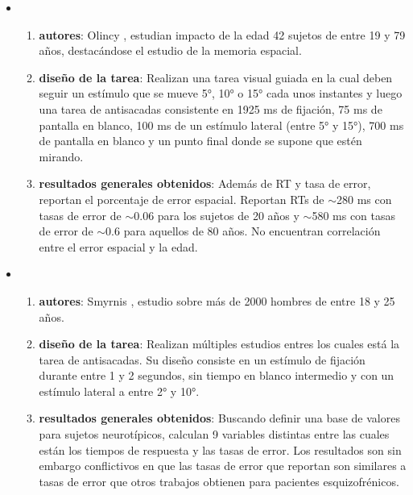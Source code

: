 \begin{itemize}
  \item \begin{enumerate}
    \item \textbf{autores}:
      Olincy \etal \cite{olincy_1997_age_diminishes_performance}, estudian
      impacto de la edad 42 sujetos de entre 19 y 79 años, destacándose el
      estudio de la memoria espacial.
    \item \textbf{diseño de la tarea}:
      Realizan una tarea visual guiada en la cual deben seguir un estímulo que
      se mueve 5°, 10° o 15° cada unos instantes y luego una tarea de
      antisacadas consistente en 1925 ms de fijación, 75 ms de pantalla en
      blanco, 100 ms de un estímulo lateral (entre 5° y 15°), 700 ms de
      pantalla en blanco y un punto final donde se supone que estén mirando.
    \item \textbf{resultados generales obtenidos}:
      Además de RT y tasa de error, reportan el porcentaje de error espacial.
      Reportan RTs de $\sim$280 ms con tasas de error de $\sim$0.06 para los
      sujetos de 20 años y $\sim$580 ms con tasas de error de $\sim$0.6 para
      aquellos de 80 años.
      No encuentran correlación entre el error espacial y la edad.
  \end{enumerate}

  \item \begin{enumerate}
    \item \textbf{autores}:
      Smyrnis \etal \cite{smyrnis_2002_big_sample}, estudio sobre más de 2000
      hombres de entre 18 y 25 años.
    \item \textbf{diseño de la tarea}:
      Realizan múltiples estudios entres los cuales está la tarea de
      antisacadas.
      Su diseño consiste en un estímulo de fijación durante entre 1 y 2
      segundos, sin tiempo en blanco intermedio y con un estímulo lateral a
      entre 2° y 10°.
    \item \textbf{resultados generales obtenidos}:
      Buscando definir una base de valores para sujetos neurotípicos, calculan
      9 variables distintas entre las cuales están los tiempos de respuesta y
      las tasas de error.
      Los resultados son sin embargo conflictivos en que las tasas de error que
      reportan son similares a tasas de error que otros trabajos obtienen para
      pacientes esquizofrénicos.
  \end{enumerate}


\end{itemize}
